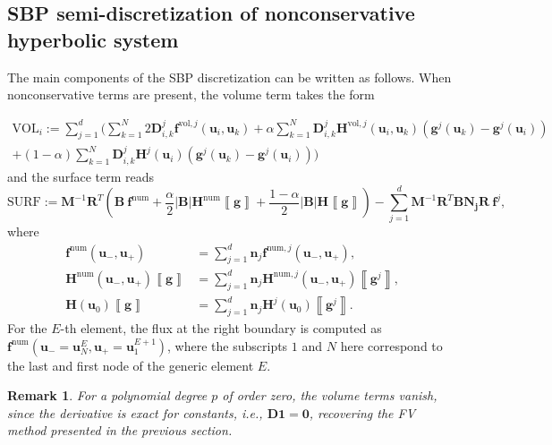 \documentclass[]{scrartcl}
\newcommand{\mtx}[1]{\boldsymbol{#1}}
\renewcommand{\vec}[1]{\boldsymbol{#1}}
\newcommand{\jump}[1]{\left\llbracket #1  \right\rrbracket}
\newtheorem{remark}[theorem]{Remark}
\theoremstyle{definition}
\begin{document}
\subsection{SBP semi-discretization of nonconservative hyperbolic system}
The main components of the SBP discretization can be written as follows.
When nonconservative terms are present, the volume term takes the form

\begin{multline}
    \label{volume_terms}
\vec{\mathrm{VOL}}_i :=  \sum_{j = 1}^d \Biggl ( \sum_{k = 1}^N 2 \mtx{D}^j_{i,k} \vec{f}^{\mathrm{vol},j}\left (\vec{u}_i, \vec{u}_k \right ) + \alpha \sum_{k = 1}^N \mtx{D}^j_{i,k} \mtx{H}^{\mathrm{vol},j}\left (\vec{u}_i, \vec{u}_k \right ) \left (\vec{g}^j(\vec{u}_k) - \vec{g}^j(\vec{u}_i) \right ) \\+(1-\alpha)\sum_{k = 1}^N \mtx{D}^j_{i,k} \mtx{H}^j\left (\vec{u}_i\right ) \left (\vec{g}^j(\vec{u}_k) - \vec{g}^j(\vec{u}_i) \right ) \Biggr )
\end{multline}
and the surface term reads
\begin{equation}
    \vec{\mathrm{SURF}}
    :=
    \mtx{M}^{-1}\mtx{R}^T \left (
        \mtx{B}\ \vec{f}^{\mathrm{num}}
        + \frac{\alpha}{2}|\mtx{B}| \mtx{H}^\mathrm{num} \jump{\vec{g}}
        + \frac{1-\alpha}{2}|\mtx{B}| \mtx{H} \jump{\vec{g}} \right )
    - \sum_{j = 1}^d \mtx{M}^{-1} \mtx{R}^T \mtx{B} \mtx{N_j} \mtx{R}\ \vec{f}^j,
    \label{surface_terms}
\end{equation}
where
\begin{equation}
    \begin{aligned}
\vec{f}^{\mathrm{num}}(\vec{u}_-, \vec{u}_+) &= \sum_{j=1}^{d} \vec{n}_j \vec{f}^{\mathrm{num},j}(\vec{u}_-, \vec{u}_+),\\
\mtx{H}^{\mathrm{num}}(\vec{u}_-, \vec{u}_+)\jump{\vec{g}} &= \sum_{j=1}^{d} \vec{n}_j \mtx{H}^{\mathrm{num},j}(\vec{u}_-, \vec{u}_+) \jump{\vec{g}^j},\\
\mtx{H}(\vec{u}_0)\jump{\vec{g}} &= \sum_{j=1}^{d} \vec{n}_j \mtx{H}^{j}(\vec{u}_0) \jump{\vec{g}^j}.
\end{aligned}
\end{equation}
For the $E$-th element, the flux at the right boundary is computed as $\vec{f}^{\mathrm{num}}(\vec{u}_- = \vec{u}_N^E, \vec{u}_+ = \vec{u}_1^{E+1})$, where the subscripts $1$ and $N$ here correspond to the last and first node of the generic element $E$.
\begin{remark}
For a polynomial degree $p$ of order zero, the volume terms vanish, since the derivative is exact for constants, i.e., $\mtx{D} \vec{1} = \vec{0}$, recovering the FV method presented in the previous section.
\end{remark}
\end{document}
